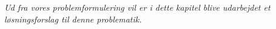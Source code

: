 \textit{Ud fra vores problemformulering vil er i dette kapitel blive udarbejdet et løsningsforslag til denne problematik.}